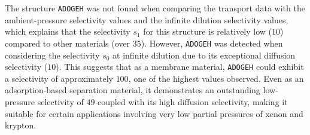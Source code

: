 \documentclass[main]{subfiles}
\begin{document}
The structure \texttt{ADOGEH}\autocite{Peikert_2012} was not found when comparing the transport data with the ambient-pressure selectivity values and the infinite dilution selectivity values, which explains that the selectivity $s_1$ for this structure is relatively low ($10$) compared to other materials (over $35$). However, \texttt{ADOGEH} was detected when considering the selectivity $s_0$ at infinite dilution due to its exceptional diffusion selectivity ($10$). This suggests that as a membrane material, \texttt{ADOGEH} could exhibit a selectivity of approximately $100$, one of the highest values observed. Even as an adsorption-based separation material, it demonstrates an outstanding low-pressure selectivity of $49$ coupled with its high diffusion selectivity, making it suitable for certain applications involving very low partial pressures of xenon and krypton.
\end{document}
